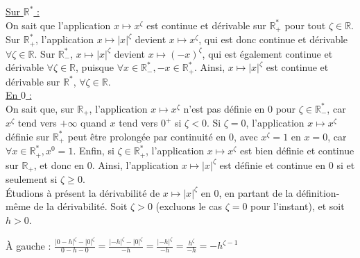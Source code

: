 \vspace{-0.2mm}
\noindent \underline{Sur $\mathbb{R}^*$ :} \\

\vspace{-0.8mm}
\noindent On sait que l'application $x \mapsto x^\zeta$ est continue et dérivable sur $\mathbb{R}_+^*$ pour tout $\zeta \in \mathbb{R}$. Sur $\mathbb{R}_+^*$, l'application $x \mapsto |x|^\zeta$ devient $x \mapsto x^\zeta$, qui est donc continue et dérivable $\forall \zeta \in \mathbb{R}$. Sur $\mathbb{R}_-^*$, $x \mapsto |x|^\zeta$ devient $x \mapsto (-x)^\zeta$, qui est également continue et dérivable $\forall \zeta \in \mathbb{R}$, puisque $\forall x \in \mathbb{R}_-^*, -x \in \mathbb{R}_+^*$. Ainsi, $x \mapsto |x|^\zeta$ est continue et dérivable sur $\mathbb{R}^*$, $\forall \zeta \in \mathbb{R}$. \\

\vspace{-0.2mm}
\noindent \underline{En $0$ :} \\


\vspace{-0.8mm}
\noindent On sait que, sur $\mathbb{R}_+$, l'application $x \mapsto x^\zeta$ n'est pas définie en $0$ pour $\zeta \in \mathbb{R}_-^*$, car $x^\zeta$ tend vers $+\infty$ quand $x$ tend vers $0^+$ si $\zeta<0$. Si $\zeta=0$, l'application $x \mapsto x^\zeta$ définie sur $\mathbb{R}_+^*$ peut être prolongée par continuité en $0$, avec $x^\zeta = 1$ en $x=0$, car $\forall x \in \mathbb{R}_+^*, x^0=1$. Enfin, si $\zeta \in \mathbb{R}_+^*$, l'application $x \mapsto x^\zeta$ est bien définie et continue sur $\mathbb{R}_+$, et donc en $0$. Ainsi, l'application $x \mapsto |x|^\zeta$ est définie et continue en $0$ si et seulement si $\zeta \geq 0$. \\

\vspace{-1.0mm}
\noindent Étudions à présent la dérivabilité de $x \mapsto |x|^\zeta$ en $0$, en partant de la définition-même de la dérivabilité.
Soit $\zeta>0$ (excluons le cas $\zeta=0$ pour l'instant), et soit $h>0$.

\vspace{1.0mm}
\noindent À gauche : $\frac{|0-h|^\zeta - |0|^\zeta}{0-h-0} = \frac{|-h|^\zeta - |0|^\zeta}{-h} = \frac{|-h|^\zeta}{-h} = \frac{h^\zeta}{-h} = -h^{\zeta-1} $

